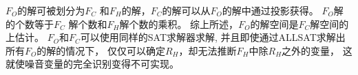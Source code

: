 %
%
$F_O$的解可被划分为$F_C$ 和$F_H$的解，$F_C$的解可以从$F_O$的解中通过投影获得。
$F_O$解的个数等于$F_C$ 解个数和$F_H$解个数的乘积。
%
%
综上所述，$F_O$的解空间是$F_C$解空间的上估计。
$F_O$和$F_C$可以使用同样的SAT求解器求解,
并且即使通过ALLSAT求解出所有$F_O$的解的情况下，
仅仅可以确定$R_H$，却无法推断$F_H$中除$R_H$之外的变量，
这就使噪音变量的完全识别变得不可实现。

%
%

